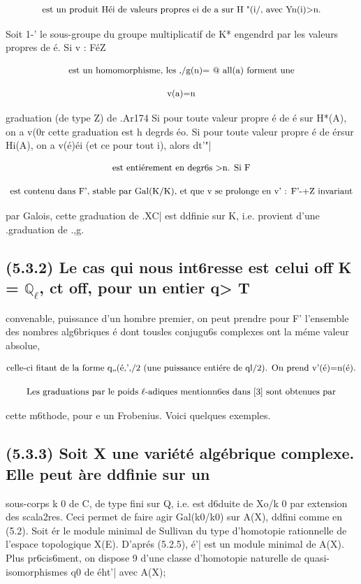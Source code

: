 \documentclass[11pt]{article}
\theoremstyle{remark}
\begin{document}
\[\text{\small est un produit Héi de valeurs propres ei de a sur H "(i/, avec Yn(i)>n.}\]

Soit 1-' le sous-groupe du groupe multiplicatif de K* engendrd par les valeurs propres de é. Si v : FéZ

\[\text{\small est un homomorphisme, les ,/g(n)= @ all(a) forment une}\]

\[\text{\small v(a)=n}\]

graduation (de type Z) de .Ar174 Si pour toute valeur propre é de é sur H*(A), on a v(0r cette graduation est h degrds éo. Si pour toute valeur propre é de érsur Hi(A), on a v(é)éi (et ce pour tout i), alors dt'"|

\[\text{\small est entiérement en degr6s >n. Si F}\]

\[\text{\small est contenu dans F', stable par Gal(K/K), et que v se prolonge en v' : F'-+Z invariant}\]

par Galois, cette graduation de .XC| est ddfinie sur K, i.e. provient d'une .graduation de .,g.

\subsection*{(5.3.2) Le cas qui nous int6resse est celui off K = \(\mathbb{Q}_{\ell}\), ct off, pour un entier q> T}

convenable, puissance d'un hombre premier, on peut prendre pour F' l'ensemble des nombres alg6briques é dont tousles conjugu6s complexes ont la méme valeur absolue,

\[\text{\small celle-ci fitant de la forme q,,(é,',/2 (une puissance entiére de ql/2). On prend v'(é)=n(é).}\]

\[\text{\small Les graduations par le poids \(\ell\)-adiques mentionn6es dans [3] sont obtenues par}\]

cette m6thode, pour e un Frobenius. Voici quelques exemples.

\subsection*{(5.3.3) Soit X une variété algébrique complexe. Elle peut àre ddfinie sur un}

sous-corps k 0 de C, de type fini sur Q, i.e. est d6duite de Xo/k 0 par extension des scala2res. Ceci permet de faire agir Gal(k0/k0) sur A(X), ddfini comme en (5.2). Soit ér le module minimal de Sullivan du type d'homotopie rationnelle de l'espace topologique X(E). D'aprés (5.2.5), é'| est un module minimal de A(X). Plus pr6cis6ment, on dispose 9 d'une classe d'homotopie naturelle de quasi-isomorphismes q0 de éht'| avec A(X);
\end{document}
